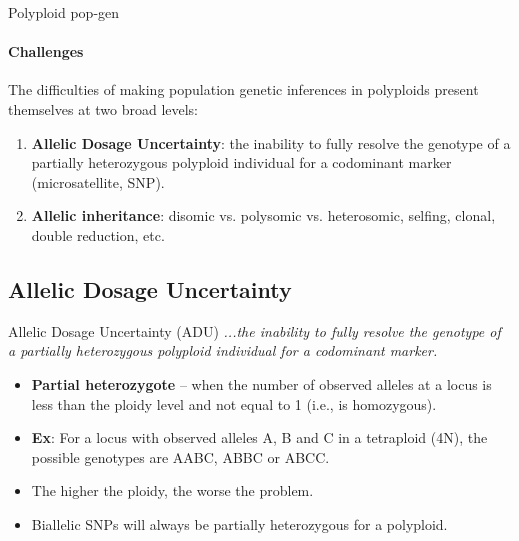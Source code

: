 \documentclass[presentation]{beamer}
\begin{document}
\begin{frame}[t]{Polyploid pop-gen}
\framesubtitle{Challenges}
	The difficulties of making population genetic inferences in polyploids present themselves at two broad levels:
	\vspace{0.1in}
	
	\begin{enumerate}
		\item \textbf{Allelic Dosage Uncertainty}: the inability to fully resolve the genotype of a partially heterozygous polyploid individual for a codominant marker (microsatellite, SNP).
		\vspace{0.2in}
		
		\item \textbf{Allelic inheritance}: disomic vs. polysomic vs. heterosomic, selfing, clonal, double reduction, etc.
	\end{enumerate}


\end{frame}

\subsection{Allelic Dosage Uncertainty}

\begin{frame}[t]{Allelic Dosage Uncertainty (ADU)}
	\textit{...the inability to fully resolve the genotype of a partially heterozygous polyploid individual for a codominant marker.}
	\vspace{0.1in}
	
	\begin{itemize}
		\item \textbf{Partial heterozygote} -- when the number of observed alleles at a locus is less than the ploidy level and not equal to 1 (i.e., is homozygous).
		\vspace{0.1in}

		\item \textbf{Ex}: For a locus with observed alleles A, B and C in a tetraploid (4N), the possible genotypes are AABC, ABBC or ABCC.
		\vspace{0.1in}
		
		\item The higher the ploidy, the worse the problem.
		\vspace{0.1in}
		
		\item Biallelic SNPs will always be partially heterozygous for a polyploid.
		
	\end{itemize}
	
\end{frame}
\end{document}
